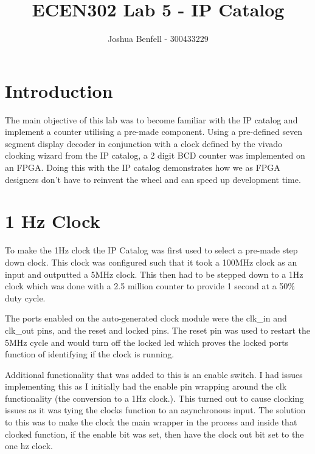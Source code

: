 \documentclass[a4paper, 12pt]{article}
\title{ECEN302 Lab 5 - IP Catalog}
\author{Joshua Benfell - 300433229}
\begin{document}
	\maketitle
	
	\section{Introduction}
		The main objective of this lab was to become familiar with the IP catalog and implement a counter utilising a pre-made component. Using a pre-defined seven segment display decoder in conjunction with a clock defined by the vivado clocking wizard from the IP catalog, a 2 digit BCD counter was implemented on an FPGA. Doing this with the IP catalog demonstrates how we as FPGA designers don't have to reinvent the wheel and can speed up development time. 
	
	\section{1 Hz Clock}
		To make the 1Hz clock the IP Catalog was first used to select a pre-made step down clock. This clock was configured such that it took a 100MHz clock as an input and outputted a 5MHz clock. This then had to be stepped down to a 1Hz clock which was done with a 2.5 million counter to provide 1 second at a 50\% duty cycle. 
		\par
		The ports enabled on the auto-generated clock module were the clk\_in and clk\_out pins, and the reset and locked pins. The reset pin was used to restart the 5MHz cycle and would turn off the locked led which proves the locked ports function of identifying if the clock is running. 
		\par
		Additional functionality that was added to this is an enable switch. I had issues implementing this as I initially had the enable pin wrapping around the clk functionality (the conversion to a 1Hz clock.). This turned out to cause clocking issues as it was tying the clocks function to an asynchronous input. The solution to this was to make the clock the main wrapper in the process and inside that clocked function, if the enable bit was set, then have the clock out bit set to the one hz clock.
\end{document}
